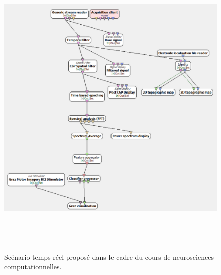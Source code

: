 \begin{figure}[h]
	\centering\includegraphics[height=15cm]{images/scenario_neuro.png}
	\caption[Scénario temps réel proposé dans le cadre du cours de neurosciences computationnelles.]{Scénario temps réel proposé dans le cadre du cours de neurosciences computationnelles.}
	\label{scenario_neuro}
\end{figure}

